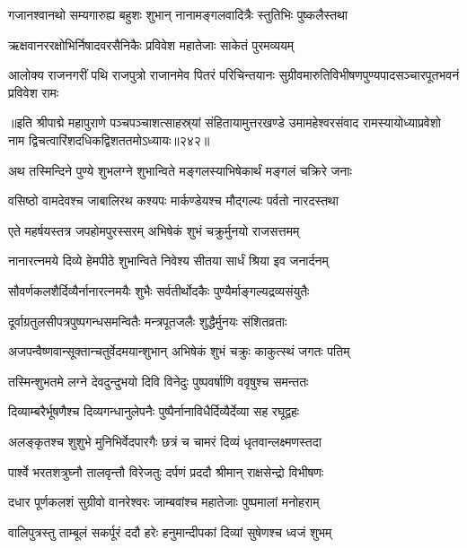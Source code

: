 \twolineshloka
{गजानश्वानथो सम्यगारुह्य बहुशः शुभान्}
{नानामङ्गलवादित्रैः स्तुतिभिः पुष्कलैस्तथा}%

\twolineshloka
{ऋक्षवानररक्षोभिर्निषादवरसैनिकैः}
{प्रविवेश महातेजाः साकेतं पुरमव्ययम्}%

\twolineshloka
{आलोक्य राजनगरीं पथि राजपुत्रो राजानमेव पितरं परिचिन्तयानः}
{सुग्रीवमारुतिविभीषणपुण्यपादसञ्चारपूतभवनं प्रविवेश रामः}%

{॥इति श्रीपाद्मे महापुराणे पञ्चपञ्चाशत्साहस्र्यां संहितायामुत्तरखण्डे उमामहेश्वरसंवाद रामस्यायोध्याप्रवेशो नाम द्विचत्वारिंशदधिकद्विशततमोऽध्यायः॥२४२॥}



\twolineshloka
{अथ तस्मिन्दिने पुण्ये शुभलग्ने शुभान्विते}
{मङ्गलस्याभिषेकार्थं मङ्गलं चक्रिरे जनाः}%

\twolineshloka
{वसिष्ठो वामदेवश्च जाबालिरथ कश्यपः}
{मार्कण्डेयश्च मौद्गल्यः पर्वतो नारदस्तथा}%

\twolineshloka
{एते महर्षयस्तत्र जपहोमपुरस्सरम्}
{अभिषेकं शुभं चक्रुर्मुनयो राजसत्तमम्}%

\twolineshloka
{नानारत्नमये दिव्ये हेमपीठे शुभान्विते}
{निवेश्य सीतया सार्धं श्रिया इव जनार्दनम्}%

\twolineshloka
{सौवर्णकलशैर्दिव्यैर्नानारत्नमयैः शुभैः}
{सर्वतीर्थोदकैः पुण्यैर्माङ्गल्यद्रव्यसंयुतैः}%

\twolineshloka
{दूर्वाग्रतुलसीपत्रपुष्पगन्धसमन्वितैः}
{मन्त्रपूतजलैः शुद्धैर्मुनयः संशितव्रताः}%

\twolineshloka
{अजपन्वैष्णवान्सूक्तान्चतुर्वेदमयान्शुभान्}
{अभिषेकं शुभं चक्रुः काकुत्स्थं जगतः पतिम्}%

\twolineshloka
{तस्मिन्शुभतमे लग्ने देवदुन्दुभयो दिवि}
{विनेदुः पुष्पवर्षाणि ववृषुश्च समन्ततः}%

\twolineshloka
{दिव्याम्बरैर्भूषणैश्च दिव्यगन्धानुलेपनैः}
{पुष्पैर्नानाविधैर्दिव्यैर्देव्या सह रघूद्वहः}%

\twolineshloka
{अलङ्कृतश्च शुशुभे मुनिभिर्वेदपारगैः}
{छत्रं च चामरं दिव्यं धृतवान्लक्ष्मणस्तदा}%

\twolineshloka
{पार्श्वे भरतशत्रुघ्नौ तालवृन्तौ विरेजतुः}
{दर्पणं प्रददौ श्रीमान् राक्षसेन्द्रो विभीषणः}%

\twolineshloka
{दधार पूर्णकलशं सुग्रीवो वानरेश्वरः}
{जाम्बवांश्च महातेजाः पुष्पमालां मनोहराम्}%

\twolineshloka
{वालिपुत्रस्तु ताम्बूलं सकर्पूरं ददौ हरेः}
{हनुमान्दीपकां दिव्यां सुषेणश्च ध्वजं शुभम्}%

